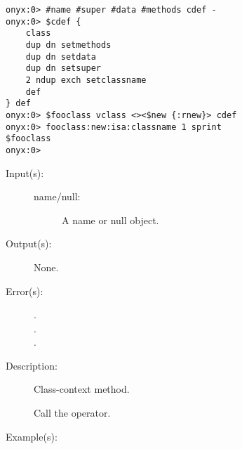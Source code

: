 \begin{description}
\begin{description}
\begin{verbatim}
onyx:0> #name #super #data #methods cdef -
onyx:0> $cdef {
    class
    dup dn setmethods
    dup dn setdata
    dup dn setsuper
    2 ndup exch setclassname
    def
} def
onyx:0> $fooclass vclass <><$new {:rnew}> cdef
onyx:0> fooclass:new:isa:classname 1 sprint
$fooclass
onyx:0>
		\end{verbatim}
	\end{description}
\label{vclass:setclassname}
\item[{\onyxop{name/null}{setclassname}{--}}: ]
	\begin{description}\item[]
	\item[Input(s): ]
		\begin{description}\item[]
		\item[name/null: ]
			A name or null object.
		\end{description}
	\item[Output(s): ] None.
	\item[Error(s): ]
		\begin{description}\item[]
		\item[.]
		\item[.]
		\item[.]
		\end{description}
	\item[Description: ]
		Class-context method.

		Call the
		operator.
	\item[Example(s): ]\begin{verbatim}


\end{verbatim}
\end{description}
\end{description}
